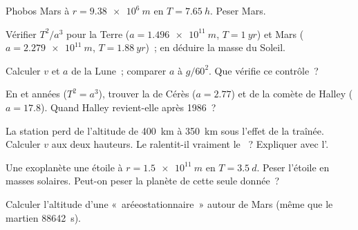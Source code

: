 \begin{exercise}[$\star\star$]\label{exo:g12:satellites-kepler:8}
Phobos  Mars à $r = \qty{9.38e6}{m}$ en $T = \qty{7.65}{h}$.
Peser Mars.
\end{exercise}

\begin{exercise}[$\star\star$]\label{exo:g12:satellites-kepler:9}
Vérifier $T^2/a^3$ pour la Terre ($a = \qty{1.496e11}{m}$,
$T = \qty{1}{yr}$) et Mars ($a = \qty{2.279e11}{m}$,
$T = \qty{1.88}{yr}$)~; en déduire la masse du Soleil.
\end{exercise}

\begin{exercise}[$\star\star$]\label{exo:g12:satellites-kepler:10}
Calculer $v$ et $a$ de la Lune~; comparer $a$ à $g/60^2$. Que
vérifie ce contrôle~?
\end{exercise}

\begin{exercise}[$\star\star$]\label{exo:g12:satellites-kepler:11}
En  et années ($T^2 = a^3$), trouver la  de
Cérès ($a = 2.77$) et de la comète de Halley ($a = 17.8$). Quand
Halley revient-elle après 1986~?
\end{exercise}

\begin{exercise}[$\star\star\star$]\label{exo:g12:satellites-kepler:12}
La station perd de l'altitude de \qty{400}{km} à \qty{350}{km} sous
l'effet de la traînée. Calculer $v$ aux deux hauteurs. Le
 ralentit-il vraiment le
~? Expliquer avec l'.
\end{exercise}

\begin{exercise}[$\star\star\star$]\label{exo:g12:satellites-kepler:13}
Une exoplanète  une étoile à $r = \qty{1.5e11}{m}$ en
$T = \qty{3.5}{d}$. Peser l'étoile en masses solaires. Peut-on peser
la planète de cette seule donnée~?
\end{exercise}

\begin{exercise}[$\star\star\star$]\label{exo:g12:satellites-kepler:14}
Calculer l'altitude d'une  «~aréeostationnaire~»
autour de Mars (même  que le  martien
\qty{88642}{s}).
\end{exercise}

